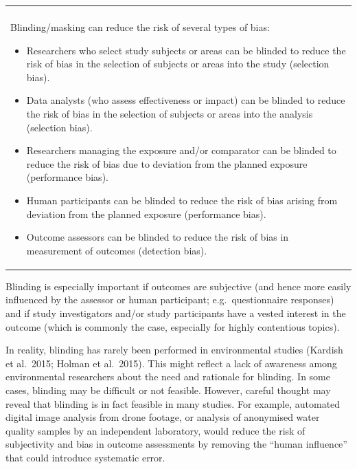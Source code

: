 \documentclass[
  letterpaper,
  DIV=11,
  numbers=noendperiod]{scrreprt}
\newcounter{none} %
\begin{document}
{\def\LTcaptype{none} %
\begin{longtable}[]{@{}
  >{\raggedright\arraybackslash}p{}@{}}
\toprule\noalign{}
\endhead
\bottomrule\noalign{}
\endlastfoot
\begin{minipage}[t]{\linewidth}\raggedright
\textbf{Box 7.2 Blinding/masking in environmental research studies}\\
Blinding/masking can reduce the risk of several types of bias:

\begin{itemize}
\item
  Researchers who select study subjects or areas can be blinded to
  reduce the risk of bias in the selection of subjects or areas into the
  study (selection bias).
\item
  Data analysts (who assess effectiveness or impact) can be blinded to
  reduce the risk of bias in the selection of subjects or areas into the
  analysis (selection bias).
\item
  Researchers managing the exposure and/or comparator can be blinded to
  reduce the risk of bias due to deviation from the planned exposure
  (performance bias).
\item
  Human participants can be blinded to reduce the risk of bias arising
  from deviation from the planned exposure (performance bias).
\item
  Outcome assessors can be blinded to reduce the risk of bias in
  measurement of outcomes (detection bias).
\end{itemize}\strut
\end{minipage} \\
\end{longtable}
}

Blinding is especially important if outcomes are subjective (and hence
more easily influenced by the assessor or human participant;
e.g.~questionnaire responses) and if study investigators and/or study
participants have a vested interest in the outcome (which is commonly
the case, especially for highly contentious topics).

In reality, blinding has rarely been performed in environmental studies
(Kardish et al.~2015; Holman et al.~2015). This might reflect a lack of
awareness among environmental researchers about the need and rationale
for blinding. In some cases, blinding may be difficult or not feasible.
However, careful thought may reveal that blinding is in fact feasible in
many studies. For example, automated digital image analysis from drone
footage, or analysis of anonymised water quality samples by an
independent laboratory, would reduce the risk of subjectivity and bias
in outcome assessments by removing the ``human influence'' that could
introduce systematic error.
\end{document}
